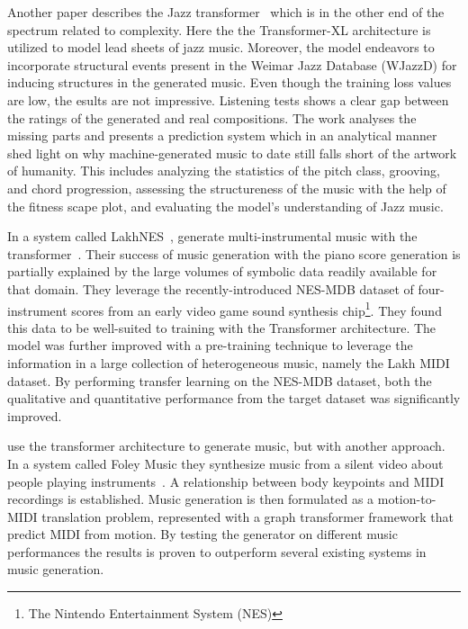 \documentclass{IEEEtran}
\begin{document}
       Another paper describes the Jazz transformer~\cite{wu2020jazz} which is in the
       other end of the spectrum related to complexity. Here the the Transformer-XL
       architecture is utilized to model lead sheets of jazz music. Moreover, the model
       endeavors to incorporate structural events present in the Weimar Jazz Database
       (WJazzD) for inducing structures in the generated music. Even though the training
       loss values are low, the esults are not impressive. Listening tests shows a clear
       gap between the ratings of the generated and real compositions. The work analyses
       the missing parts and presents a prediction system which in an analytical manner
       shed light on why machine-generated music to date still falls short of the artwork
       of humanity. This includes analyzing the statistics of
       the pitch class, grooving, and chord progression, assessing the structureness of
       the music with the help of the fitness scape plot, and evaluating the model’s
       understanding of Jazz music.

       In a system called LakhNES~\citeauthor{donahue2019lakhnes},
       generate multi-instrumental music with the transformer~\cite{donahue2019lakhnes}.
       Their success of music generation with the piano score generation is partially
       explained by the large volumes of symbolic data readily available for that domain.
       They leverage the recently-introduced NES-MDB dataset of four-instrument scores
       from an early video game sound synthesis
       chip\footnote{The Nintendo Entertainment System (NES)}.
       They found this data to be well-suited to training with the
       Transformer architecture. The model was further improved with a pre-training
       technique to leverage the information in a large collection of heterogeneous music,
       namely the Lakh MIDI dataset. By performing transfer learning on the NES-MDB dataset,
       both the qualitative and quantitative performance from the target dataset was
       significantly improved.
       
        \citeauthor{gan2020foley} use
        the transformer architecture to generate music, but with another approach.
        In a system called Foley Music they synthesize music from a silent video about
        people playing instruments~\cite{gan2020foley}.
        A relationship between body keypoints and MIDI recordings is established.
        Music generation is then formulated as a motion-to-MIDI translation problem,
        represented with a graph transformer framework that predict MIDI from motion.
        By testing the generator on different music performances the results is proven to outperform several existing systems in music generation.
\end{document}

